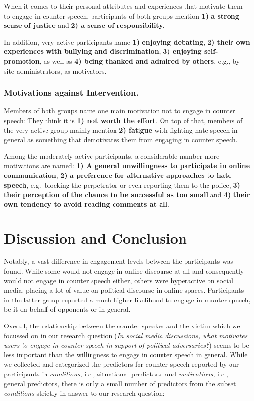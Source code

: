 \documentclass[runningheads]{llncs}
\begin{document}
When it comes to their personal attributes and experiences that motivate them to engage in counter speech, participants of both groups mention
\textbf{1) a strong sense of justice } and
\textbf{2) a sense of responsibility}.

In addition, very active participants name
\textbf{1) enjoying debating},
\textbf{2) their own experiences with bullying and discrimination},
\textbf{3) enjoying self-promotion}, as well as
\textbf{4) being thanked and admired by others}, e.g., by site administrators,
as motivators.

\hypertarget{motivations-against-intervention.}{%
\subsubsection{Motivations against Intervention.}\label{motivations-against-intervention.}}

Members of both groups name one main motivation not to engage in counter speech: They think it is \textbf{1) not worth the effort}. On top of that, members of the very active group mainly mention \textbf{2) fatigue} with fighting hate speech in general as something that demotivates them from engaging in counter speech.

Among the moderately active participants, a considerable number more motivations are named:
\textbf{1) A general unwillingness to participate in online communication},
\textbf{2) a preference for alternative approaches to hate speech}, e.g.~blocking the perpetrator or even reporting them to the police,
\textbf{3) their perception of the chance to be successful as too small} and
\textbf{4) their own tendency to avoid reading comments at all}.

\hypertarget{discussion-and-conclusion}{%
\section{Discussion and Conclusion}\label{discussion-and-conclusion}}

Notably, a vast difference in engagement levels between the participants was found. While some would not engage in online discourse at all and consequently would not engage in counter speech either, others were hyperactive on social media, placing a lot of value on political discourse in online spaces. Participants in the latter group reported a much higher likelihood to engage in counter speech, be it on behalf of opponents or in general.

Overall, the relationship between the counter speaker and the victim which we focussed on in our research question (\emph{In social media discussions, what motivates users to engage in counter speech in support of political adversaries?}) seems to be less important than the willingness to engage in counter speech in general. While we collected and categorized the predictors for counter speech reported by our participants in \emph{conditions}, i.e., situational predictors, and \emph{motivations}, i.e., general predictors, there is only a small number of predictors from the subset \emph{conditions} strictly in answer to our research question:
\end{document}
